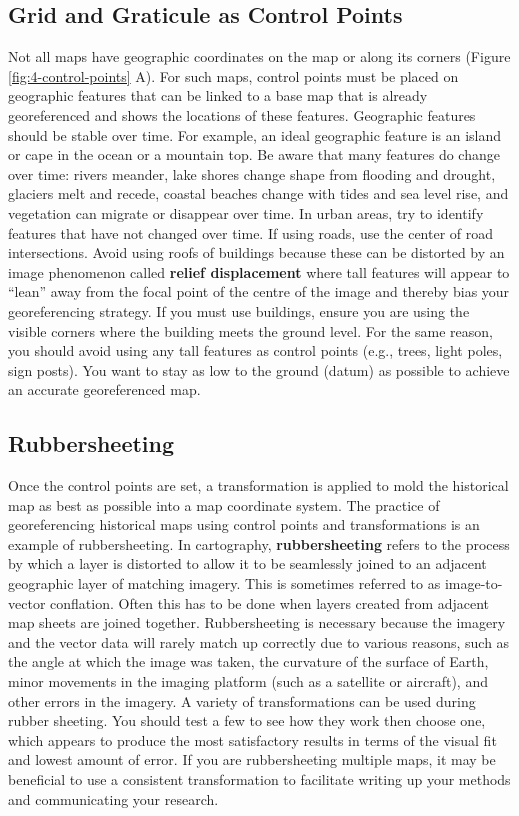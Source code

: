 \documentclass[
]{book}
\begin{document}
\subsection{Grid and Graticule as Control Points}\label{grid-and-graticule-as-control-points}

Not all maps have geographic coordinates on the map or along its corners (Figure \ref{fig:4-control-points} A). For such maps, control points must be placed on geographic features that can be linked to a base map that is already georeferenced and shows the locations of these features. Geographic features should be stable over time. For example, an ideal geographic feature is an island or cape in the ocean or a mountain top. Be aware that many features do change over time: rivers meander, lake shores change shape from flooding and drought, glaciers melt and recede, coastal beaches change with tides and sea level rise, and vegetation can migrate or disappear over time. In urban areas, try to identify features that have not changed over time. If using roads, use the center of road intersections. Avoid using roofs of buildings because these can be distorted by an image phenomenon called \textbf{relief displacement} where tall features will appear to ``lean'' away from the focal point of the centre of the image and thereby bias your georeferencing strategy. If you must use buildings, ensure you are using the visible corners where the building meets the ground level. For the same reason, you should avoid using any tall features as control points (e.g., trees, light poles, sign posts). You want to stay as low to the ground (datum) as possible to achieve an accurate georeferenced map.

\subsection{Rubbersheeting}\label{rubbersheeting}

Once the control points are set, a transformation is applied to mold the historical map as best as possible into a map coordinate system. The practice of georeferencing historical maps using control points and transformations is an example of rubbersheeting. In cartography, \textbf{rubbersheeting} refers to the process by which a layer is distorted to allow it to be seamlessly joined to an adjacent geographic layer of matching imagery. This is sometimes referred to as image-to-vector conflation. Often this has to be done when layers created from adjacent map sheets are joined together. Rubbersheeting is necessary because the imagery and the vector data will rarely match up correctly due to various reasons, such as the angle at which the image was taken, the curvature of the surface of Earth, minor movements in the imaging platform (such as a satellite or aircraft), and other errors in the imagery. A variety of transformations can be used during rubber sheeting. You should test a few to see how they work then choose one, which appears to produce the most satisfactory results in terms of the visual fit and lowest amount of error. If you are rubbersheeting multiple maps, it may be beneficial to use a consistent transformation to facilitate writing up your methods and communicating your research.
\end{document}
